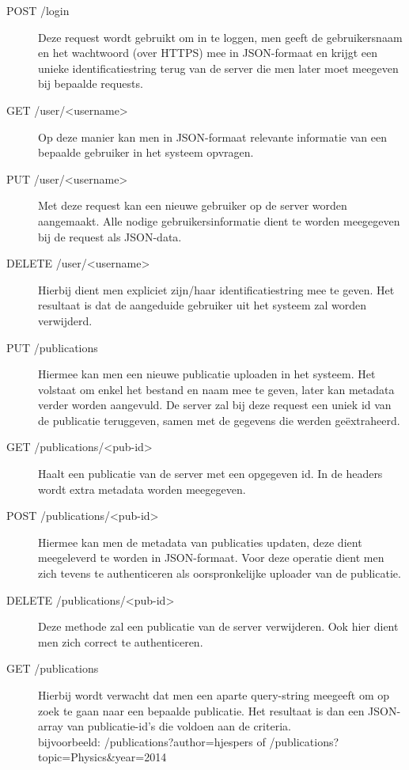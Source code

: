 \documentclass{article}
\begin{document}
\begin{description}
\item[POST /login] Deze request wordt gebruikt om in te loggen, men geeft de gebruikersnaam en het wachtwoord (over HTTPS) mee in JSON-formaat en krijgt een unieke identificatiestring terug van de server die men later moet meegeven bij bepaalde requests.

\item[GET /user/<username>] Op deze manier kan men in JSON-formaat relevante informatie van een bepaalde gebruiker in het systeem opvragen.

\item[PUT /user/<username>] Met deze request kan een nieuwe gebruiker op de server worden aangemaakt. Alle nodige gebruikersinformatie dient te worden meegegeven bij de request als JSON-data.

\item[DELETE /user/<username>] Hierbij dient men expliciet zijn/haar identificatiestring mee te geven. Het resultaat is dat de aangeduide gebruiker uit het systeem zal worden verwijderd.

\item[PUT /publications] Hiermee kan men een nieuwe publicatie uploaden in het systeem. Het volstaat om enkel het bestand en naam mee te geven, later kan metadata verder worden aangevuld. De server zal bij deze request een uniek id van de publicatie teruggeven, samen met de gegevens die werden ge\"extraheerd.

\item[GET /publications/<pub-id>] Haalt een publicatie van de server met een opgegeven id. In de headers wordt extra metadata worden meegegeven.

\item[POST /publications/<pub-id>] Hiermee kan men de metadata van publicaties updaten, deze dient meegeleverd te worden in JSON-formaat. Voor deze operatie dient men zich tevens te authenticeren als oorspronkelijke uploader van de publicatie.

\item[DELETE /publications/<pub-id>] Deze methode zal een publicatie van de server verwijderen. Ook hier dient men zich correct te authenticeren.

\item[GET /publications] Hierbij wordt verwacht dat men een aparte query-string meegeeft om op zoek te gaan naar een bepaalde publicatie. Het resultaat is dan een JSON-array van publicatie-id's die voldoen aan de criteria. \\
bijvoorbeeld: /publications?author=hjespers of /publications?topic=Physics\&year=2014

\end{description}
\end{document}
